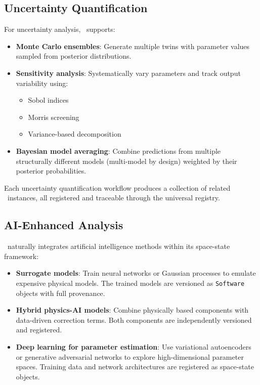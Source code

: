 \subsection{Uncertainty Quantification}

For uncertainty analysis, \hydrot\ supports:

\begin{itemize}
\item \textbf{Monte Carlo ensembles}: Generate multiple twins with parameter values sampled from posterior distributions.

\item \textbf{Sensitivity analysis}: Systematically vary parameters and track output variability using:
\begin{itemize}
    \item Sobol indices
    \item Morris screening
    \item Variance-based decomposition
\end{itemize}

\item \textbf{Bayesian model averaging}: Combine predictions from multiple structurally different models (multi-model by design) weighted by their posterior probabilities.
\end{itemize}

Each uncertainty quantification workflow produces a collection of related \hydrot\ instances, all registered and traceable through the universal registry.

\subsection{AI-Enhanced Analysis}

\hydrot\ naturally integrates artificial intelligence methods within its space-state framework:

\begin{itemize}
\item \textbf{Surrogate models}: Train neural networks or Gaussian processes to emulate expensive physical models. The trained models are versioned as \texttt{Software} objects with full provenance.

\item \textbf{Hybrid physics-AI models}: Combine physically based components with data-driven correction terms. Both components are independently versioned and registered.

\item \textbf{Deep learning for parameter estimation}: Use variational autoencoders or generative adversarial networks to explore high-dimensional parameter spaces. Training data and network architectures are registered as space-state objects.
\end{itemize}

